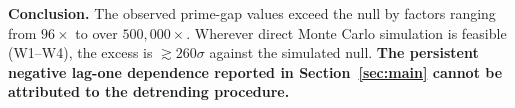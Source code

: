\documentclass[11pt]{article}
\begin{document}
\noindent\textbf{Conclusion.} The observed prime-gap values exceed the
null by factors ranging from $96\times$ to over $500{,}000\times$.
Wherever direct Monte Carlo simulation is feasible (W1--W4), the
excess is $\gtrsim 260\sigma$ against the simulated null.
\textbf{The persistent negative lag-one dependence reported in
Section~\ref{sec:main} cannot be attributed to the detrending
procedure.}

\end{document}
